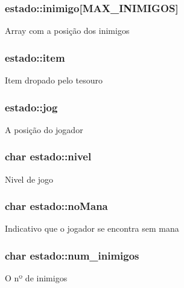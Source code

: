 \subsubsection[{\texorpdfstring{inimigo}{inimigo}}]{ estado\+::inimigo\mbox{[}{\bf M\+A\+X\+\_\+\+I\+N\+I\+M\+I\+G\+OS}\mbox{]}}\hypertarget{structestado_a85c620d8bd760efde2d2681df831dcb2}{}\label{structestado_a85c620d8bd760efde2d2681df831dcb2}
Array com a posição dos inimigos 
\subsubsection[{\texorpdfstring{item}{item}}]{ estado\+::item}\hypertarget{structestado_a2c147e6348aeaa62b05ff2109f0f2bf4}{}\label{structestado_a2c147e6348aeaa62b05ff2109f0f2bf4}
Item dropado pelo tesouro 
\subsubsection[{\texorpdfstring{jog}{jog}}]{ estado\+::jog}\hypertarget{structestado_aba384d85c8fd0406b06aa2f478874bc1}{}\label{structestado_aba384d85c8fd0406b06aa2f478874bc1}
A posição do jogador 
\subsubsection[{\texorpdfstring{nivel}{nivel}}]{\setlength{\rightskip}{0pt plus 5cm}char estado\+::nivel}\hypertarget{structestado_a620f2f81ebfe4cba1d6e44b09a1762f7}{}\label{structestado_a620f2f81ebfe4cba1d6e44b09a1762f7}
Nivel de jogo 
\subsubsection[{\texorpdfstring{no\+Mana}{noMana}}]{\setlength{\rightskip}{0pt plus 5cm}char estado\+::no\+Mana}\hypertarget{structestado_a4b38ac23d32fda340afb2b57bfdcc2c4}{}\label{structestado_a4b38ac23d32fda340afb2b57bfdcc2c4}
Indicativo que o jogador se encontra sem mana 
\subsubsection[{\texorpdfstring{num\+\_\+inimigos}{num_inimigos}}]{\setlength{\rightskip}{0pt plus 5cm}char estado\+::num\+\_\+inimigos}\hypertarget{structestado_a6fbc4a80c4f371036f264ecfe27e5f9e}{}\label{structestado_a6fbc4a80c4f371036f264ecfe27e5f9e}
O nº de inimigos 
